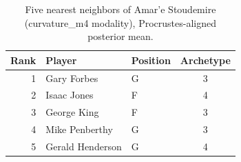 \begin{table}[htbp]
  \centering\small
  \begin{tabular}{rllc}
    \toprule
    Rank & Player & Position & Archetype \\
    \midrule
    1 & Gary Forbes & G & 3 \\
    2 & Isaac Jones & F & 4 \\
    3 & George King & F & 3 \\
    4 & Mike Penberthy & G & 3 \\
    5 & Gerald Henderson & G & 4 \\
    \bottomrule
  \end{tabular}
  \caption{Five nearest neighbors of Amar'e Stoudemire (curvature_m4 modality), Procrustes-aligned posterior mean.}
  \label{tab:Amar_e_Stoudemire_neighbors_curvature_m4}
\end{table}

